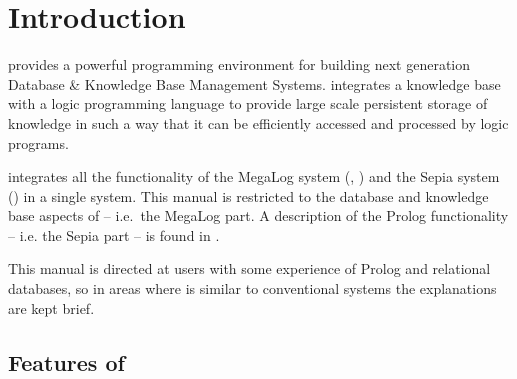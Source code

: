 %
% 
% 
% 
% 


\chapter{Introduction}

\eclipse provides a powerful programming environment for building 
next generation Data\-base \& Knowledge Base Management Systems.  
\eclipse integrates a knowledge base with a logic programming 
language to provide large scale persistent storage of knowledge in such a 
way that it can be efficiently accessed and processed by logic programs.

\eclipse integrates all the functionality of the MegaLog system
(\cite{BOC90}, \cite{BDH90}) and the Sepia system 
(\cite{SP91}) in a single system.
This manual is restricted to the database and knowledge base aspects of
\eclipse -- 
i.e.\ the MegaLog part. A description of the Prolog functionality 
-- i.e. the Sepia part -- is found in \cite{SP91}.

This manual is directed at users with some experience of Prolog and 
relational databases, so in areas where \eclipse is similar to conventional
systems the explanations are kept brief. 

\section{Features of \eclipse}

